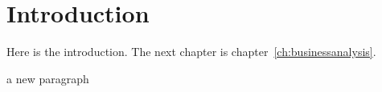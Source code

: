 \chapter{Introduction}\label{ch:introduction}
Here is the introduction. The next chapter is chapter~\ref{ch:businessanalysis}.


a new paragraph